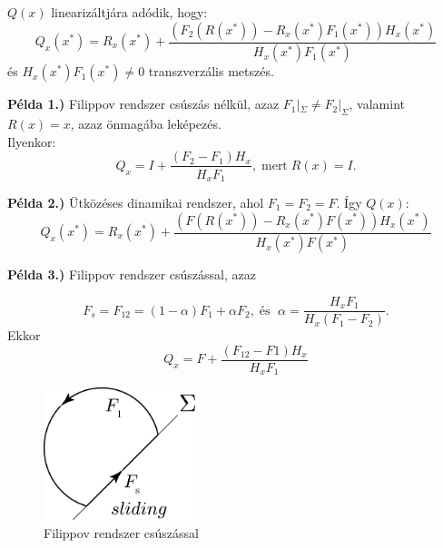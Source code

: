  $Q(x)$ linearizáltjára adódik, hogy:
 \begin{equation}
  Q_x(x^*)=R_x(x^*)+\frac{(F_2(R(x^*))-R_x(x^*)F_1(x^*))H_x(x^*)}{H_x(x^*)F_1(x^*)}
 \end{equation}
  és $H_x(x^*)F_1(x^*)\neq 0$ transzverzális metszés.



 \textbf{Példa 1.)} Filippov rendszer csúszás nélkül, azaz $F_1|_\Sigma \neq F_2|_\Sigma$, valamint $R(x)=x$, azaz önmagába leképezés. \\
 Ilyenkor:
 \[Q_x=I+\frac{(F_2-F_1)H_x}{H_xF_1}, \; \text{mert} \; R(x)=I.\]

 \textbf{Példa 2.)} Ütközéses dinamikai rendszer, ahol $F_1=F_2=F$.
Így $Q(x):$
\[
Q_x(x^*)=R_x(x^*)+\frac{(F(R(x^*))-R_x(x^*)F(x^*))H_x(x^*)}{H_x(x^*)F(x^*)}
\]

 \textbf{Példa 3.)} Filippov rendszer csúszással, azaz
 
 \[
 F_s=F_{12}=(1-\alpha)F_1+\alpha F_2, \; \text{és } \; \alpha=\frac{H_x F_1}{H_x(F_1-F_2)}.
 \]
 Ekkor
\[
	Q_x=F+\frac{(F_{12}-F1)H_x}{H_xF_1}
\]

\begin{figure}[ht]
	\centering
	\includegraphics[width=0.4\textwidth]{graphics/5_3.png}
	\caption{Filippov rendszer csúszással}\label{fig:503}
\end{figure}
\clearpage

